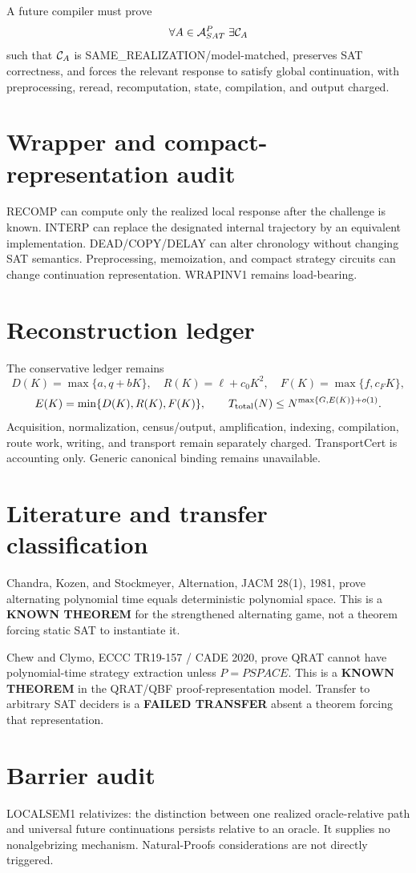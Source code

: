 \documentclass[11pt]{article}
\begin{document}
A future compiler must prove
\[
\forall A\in{\cal A}_{SAT}^{P}\;\exists {\cal C}_A
\]
such that \({\cal C}_A\) is SAME\_REALIZATION/model-matched, preserves SAT correctness, and forces the relevant response to satisfy global continuation, with preprocessing, reread, recomputation, state, compilation, and output charged.

\section*{Wrapper and compact-representation audit}
RECOMP can compute only the realized local response after the challenge is known. INTERP can replace the designated internal trajectory by an equivalent implementation. DEAD/COPY/DELAY can alter chronology without changing SAT semantics. Preprocessing, memoization, and compact strategy circuits can change continuation representation. WRAPINV1 remains load-bearing.

\section*{Reconstruction ledger}
The conservative ledger remains
\[
D(K)=\max\{a,q+bK\},\quad R(K)=\ell+c_0K^2,\quad F(K)=\max\{f,c_FK\},
\]
\[
E(K)=\min\{D(K),R(K),F(K)\},\qquad
T_{\rm total}(N)\le N^{\max\{G,E(K)\}+o(1)}.
\]
Acquisition, normalization, census/output, amplification, indexing, compilation, route work, writing, and transport remain separately charged. TransportCert is accounting only. Generic canonical binding remains unavailable.

\section*{Literature and transfer classification}
Chandra, Kozen, and Stockmeyer, Alternation, JACM 28(1), 1981, prove alternating polynomial time equals deterministic polynomial space. This is a \textbf{KNOWN THEOREM} for the strengthened alternating game, not a theorem forcing static SAT to instantiate it.

Chew and Clymo, ECCC TR19-157 / CADE 2020, prove QRAT cannot have polynomial-time strategy extraction unless \(P=PSPACE\). This is a \textbf{KNOWN THEOREM} in the QRAT/QBF proof-representation model. Transfer to arbitrary SAT deciders is a \textbf{FAILED TRANSFER} absent a theorem forcing that representation.

\section*{Barrier audit}
LOCALSEM1 relativizes: the distinction between one realized oracle-relative path and universal future continuations persists relative to an oracle. It supplies no nonalgebrizing mechanism. Natural-Proofs considerations are not directly triggered.
\end{document}
